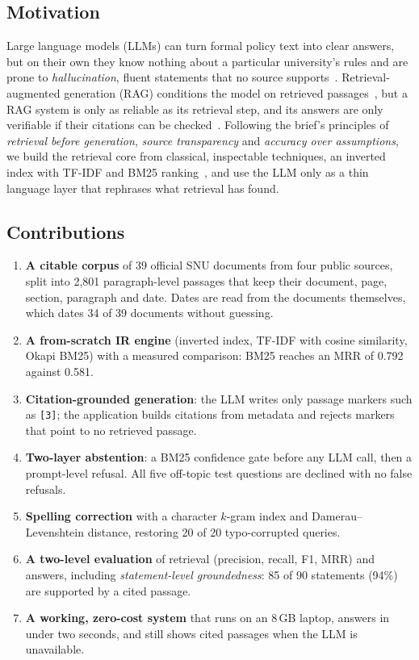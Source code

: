 \documentclass[conference]{IEEEtran}
\newcommand{\code}[1]{\texttt{#1}}
\begin{document}
\subsection{Motivation}
Large language models (LLMs) can turn formal policy text into clear answers, but on their own they know nothing about a particular university's rules and are prone to \emph{hallucination}, fluent statements that no source supports~\cite{ji2023hallucination}. Retrieval-augmented generation (RAG) conditions the model on retrieved passages~\cite{lewis2020rag}, but a RAG system is only as reliable as its retrieval step, and its answers are only verifiable if their citations can be checked~\cite{gao2023alce}. Following the brief's principles of \emph{retrieval before generation}, \emph{source transparency} and \emph{accuracy over assumptions}, we build the retrieval core from classical, inspectable techniques, an inverted index with TF-IDF and BM25 ranking~\cite{salton1988term,robertson2009bm25}, and use the LLM only as a thin language layer that rephrases what retrieval has found.

\subsection{Contributions}
\begin{enumerate}
\item \textbf{A citable corpus} of 39 official SNU documents from four public sources, split into 2{,}801 paragraph-level passages that keep their document, page, section, paragraph and date. Dates are read from the documents themselves, which dates 34 of 39 documents without guessing.
\item \textbf{A from-scratch IR engine} (inverted index, TF-IDF with cosine similarity, Okapi BM25) with a measured comparison: BM25 reaches an MRR of 0.792 against 0.581.
\item \textbf{Citation-grounded generation}: the LLM writes only passage markers such as \code{[3]}; the application builds citations from metadata and rejects markers that point to no retrieved passage.
\item \textbf{Two-layer abstention}: a BM25 confidence gate before any LLM call, then a prompt-level refusal. All five off-topic test questions are declined with no false refusals.
\item \textbf{Spelling correction} with a character $k$-gram index and Damerau--Levenshtein distance, restoring 20 of 20 typo-corrupted queries.
\item \textbf{A two-level evaluation} of retrieval (precision, recall, F1, MRR) and answers, including \emph{statement-level groundedness}: 85 of 90 statements (94\%) are supported by a cited passage.
\item \textbf{A working, zero-cost system} that runs on an 8\,GB laptop, answers in under two seconds, and still shows cited passages when the LLM is unavailable.
\end{enumerate}
\end{document}
